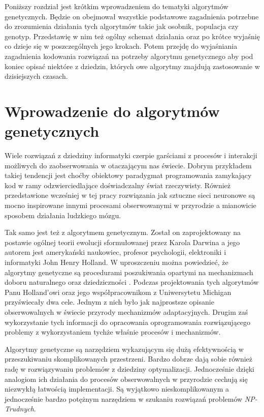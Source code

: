\documentclass[12pt, oneside, a4paper]{report}
\begin{document}
Poniższy rozdział jest krótkim wprowadzeniem do tematyki algorytmów genetycznych. Będzie on obejmował wszystkie podstawowe zagadnienia potrzebne do zrozumienia działania tych algorytmów takie jak osobnik, populacja czy genotyp. Przedstawię w nim też ogólny schemat działania oraz po krótce wyjaśnię co dzieje się w poszczególnych jego krokach. Potem przejdę do wyjaśniania zagadnienia kodowania rozwiązań na potrzeby algorytmu genetycznego aby pod koniec opisać niektóre z dziedzin, których owe algorytmy znajdują zastosowanie w dzisiejszych czasach.

\section{Wprowadzenie do algorytmów genetycznych}

Wiele rozwiązań z dziedziny informatyki czerpie garściami z procesów i interakcji możliwych do zaobserwowania w otaczającym nas świecie. Dobrym przykładem takiej tendencji jest choćby obiektowy paradygmat programowania zamykający kod w ramy odzwierciedlające doświadczalny świat rzeczywisty. Również przedstawione wcześniej w tej pracy rozwiązania jak sztuczne sieci neuronowe są mocno inspirowane innymi procesami obserwowanymi w przyrodzie a mianowicie sposobem działania ludzkiego mózgu. 

Tak samo jest też z algorytmem genetycznym. Został on zaprojektowany na postawie ogólnej teorii ewolucji sformułowanej przez Karola Darwina a jego autorem jest amerykański naukowiec, profesor psychologii, elektroniki i informatyki John Henry Holland. W uproszczeniu można powiedzieć, że algorytmy genetyczne są procedurami poszukiwania opartymi na mechanizmach doboru naturalnego oraz dziedziczności \citep{goldberg1995algorytmygenetyczne}. Podczas projektowania tych algorytmów Panu Holland'owi oraz jego współpracownikom z Uniwersytetu Michigan przyświecały dwa cele. Jednym z nich było jak najprostsze opisanie obserwowalnych w świecie przyrody mechanizmów adaptacyjnych. Drugim zaś wykorzystanie tych informacji do opracowania oprogramowania rozwiązującego problemy z wykorzystaniem tychże właśnie procesów i mechanizmów.

Algorytmy genetyczne są narzędziem wykazującym się dużą efektywnością w przeszukiwaniu skomplikowanych przestrzeni. Bardzo dobrze dają sobie również radę w rozwiązywaniu problemów z dziedziny optymalizacji. Jednocześnie dzięki analogiom ich działania do procesów obserwowalnych w przyrodzie cechują się niezwykłą łatwością implementacji. Są wyjątkowo nieskomplikowanym a jednocześnie bardzo potężnym narzędziem w szukaniu rozwiązań problemów \textit{NP-Trudnych}.
\end{document}

